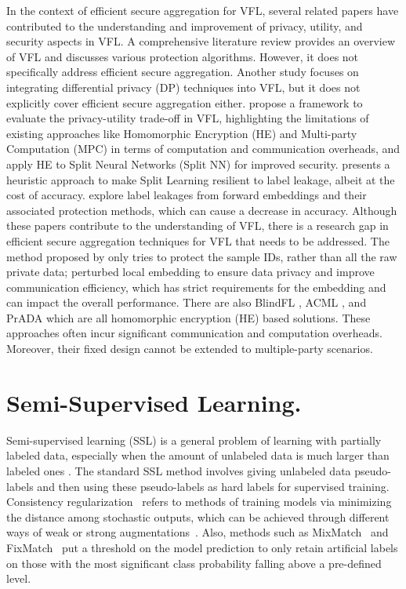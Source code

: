 \documentclass[withindex,glossary,firstyr]{cam-thesis}
\begin{document}
In the context of efficient secure aggregation for VFL, several related papers have contributed to the understanding and improvement of privacy, utility, and security aspects in VFL. A comprehensive literature review \citep{vfl} provides an overview of VFL and discusses various protection algorithms. However, it does not specifically address efficient secure aggregation. Another study \citep{dpvfl} focuses on integrating differential privacy (DP) techniques into VFL, but it does not explicitly cover efficient secure aggregation either. 
\citet{tradeoffvfl} propose a framework to evaluate the privacy-utility trade-off in VFL, highlighting the limitations of existing approaches like Homomorphic Encryption (HE) and Multi-party Computation (MPC) in terms of computation and communication overheads, and \citet{cai2023secure} apply HE to Split Neural Networks (Split NN) for improved security. \citet{zheng2022making} presents a heuristic approach to make Split Learning resilient to label leakage, albeit at the cost of accuracy. \citet{sun2022label} explore label leakages from forward embeddings and their associated protection methods, which can cause a decrease in accuracy. Although these papers contribute to the understanding of VFL, there is a research gap in efficient secure aggregation techniques for VFL that needs to be addressed. The method proposed by \citet{liu2020asymmetrical} only tries to protect the sample IDs, rather than all the raw private data; \citet{chen2020vafl} perturbed local embedding to ensure data privacy and improve communication efficiency, which has strict requirements for the embedding and can impact the overall performance. There are also BlindFL \citep{fu2022blindfl}, ACML \citep{zhang2020acml}, and PrADA \citep{ kang2022prada} which are all homomorphic encryption (HE) based solutions. These approaches often incur significant communication and computation overheads. Moreover, their fixed design cannot be extended to multiple-party scenarios.

\section{Semi-Supervised Learning.} Semi-supervised learning (SSL) is a general problem of learning with partially labeled data, especially when the amount of unlabeled data is much larger than labeled ones \citep{zhou2005tri, rasmus2015semi}. The standard SSL method involves giving unlabeled data pseudo-labels \citep{lee2013pseudo} and then using these pseudo-labels as hard labels for supervised training. Consistency regularization~\citep{bachman2014learning} refers to methods of training models via minimizing the distance among stochastic outputs, which can be achieved through different ways of weak or strong augmentations~\citep{cubuk2020randaugment, thulasidasan2019mixup, french2017self}. Also, methods such as MixMatch~\citep{mixmatch} and FixMatch~\citep{fixmatch} put a threshold on the model prediction to only retain artificial labels on those with the most significant class probability falling above a pre-defined level.  
\end{document}
